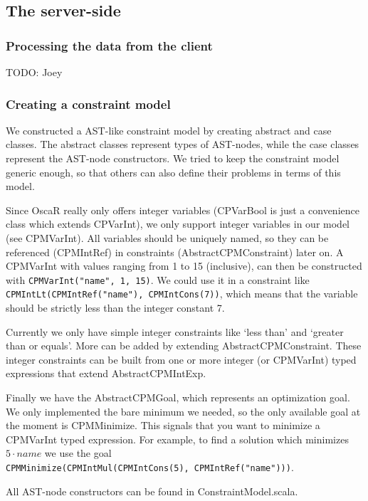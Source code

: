 \documentclass[a4paper]{article}
\begin{document}
\subsection{The server-side}
\subsubsection{Processing the data from the client}
\label{sec:ProcessingClientData}
{\Large TODO:} Joey

\subsubsection{Creating a constraint model}
We constructed a AST-like constraint model by creating 
abstract and case classes. 
The abstract classes represent types of AST-nodes, 
while the case classes represent the AST-node constructors.
We tried to keep the constraint model generic enough,
so that others can also define their problems in terms of this model.

Since OscaR really only offers integer variables 
(CPVarBool is just a convenience class which extends CPVarInt),
we only support integer variables in our model (see CPMVarInt).
All variables should be uniquely named, 
so they can be referenced (CPMIntRef) in constraints (AbstractCPMConstraint) later on.
A CPMVarInt with values ranging from 1 to 15 (inclusive), 
can then be constructed with \verb|CPMVarInt("name", 1, 15)|.
We could use it in a constraint like 
\verb|CPMIntLt(CPMIntRef("name"), CPMIntCons(7))|,
which means that the variable should be strictly less than the integer constant 7.

Currently we only have simple integer constraints
like `less than' and `greater than or equals'.
More can be added by extending AbstractCPMConstraint.
These integer constraints can be built from one or more integer 
(or CPMVarInt) typed expressions that extend AbstractCPMIntExp.

Finally we have the AbstractCPMGoal, 
which represents an optimization goal.
We only implemented the bare minimum we needed,
so the only available goal at the moment is CPMMinimize.
This signals that you want to minimize a CPMVarInt typed
expression.
For example, to find a solution which minimizes $5\cdot name$ we use the goal
\\\verb|CPMMinimize(CPMIntMul(CPMIntCons(5), CPMIntRef("name")))|.

All AST-node constructors can be found in ConstraintModel.scala.
\end{document}
